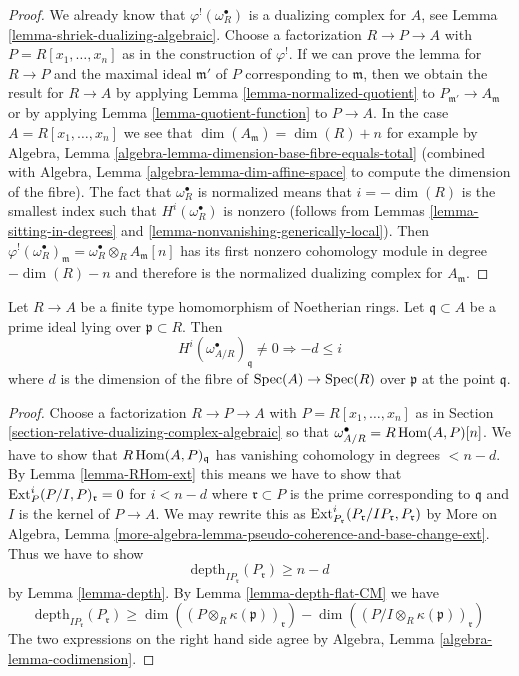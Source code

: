 \begin{proof}
We already know that $\varphi^!(\omega_R^\bullet)$ is a dualizing
complex for $A$, see Lemma \ref{lemma-shriek-dualizing-algebraic}.
Choose a factorization $R \to P \to A$ with $P = R[x_1, \ldots, x_n]$
as in the construction of $\varphi^!$. If we can prove the
lemma for $R \to P$ and the maximal ideal $\mathfrak m'$ of $P$ corresponding to
$\mathfrak m$, then we obtain the result for $R \to A$ by
applying Lemma \ref{lemma-normalized-quotient} to
$P_{\mathfrak m'} \to A_\mathfrak m$ or by applying
Lemma \ref{lemma-quotient-function} to $P \to A$.
In the case $A = R[x_1, \ldots, x_n]$ we see that
$\dim(A_\mathfrak m) = \dim(R) + n$ for example by
Algebra, Lemma \ref{algebra-lemma-dimension-base-fibre-equals-total}
(combined with Algebra, Lemma \ref{algebra-lemma-dim-affine-space}
to compute the dimension of the fibre).
The fact that $\omega_R^\bullet$ is normalized means
that $i = -\dim(R)$ is the smallest index such that
$H^i(\omega_R^\bullet)$ is nonzero (follows from
Lemmas \ref{lemma-sitting-in-degrees} and
\ref{lemma-nonvanishing-generically-local}).
Then $\varphi^!(\omega_R^\bullet)_\mathfrak m =
\omega_R^\bullet \otimes_R A_\mathfrak m[n]$
has its first nonzero cohomology module in degree $-\dim(R) - n$
and therefore is the normalized dualizing complex for $A_\mathfrak m$.
\end{proof}

\begin{lemma}
\label{lemma-relative-dualizing-trivial-vanishing}
Let $R \to A$ be a finite type homomorphism of Noetherian rings.
Let $\mathfrak q \subset A$ be a prime ideal lying over
$\mathfrak p \subset R$. Then
$$
H^i(\omega_{A/R}^\bullet)_\mathfrak q \not = 0
\Rightarrow - d \leq i
$$
where $d$ is the dimension of the fibre of $\mathop{\mathrm{Spec}}(A) \to \mathop{\mathrm{Spec}}(R)$
over $\mathfrak p$ at the point $\mathfrak q$.
\end{lemma}

\begin{proof}
Choose a factorization $R \to P \to A$ with $P = R[x_1, \ldots, x_n]$
as in Section \ref{section-relative-dualizing-complex-algebraic}
so that $\omega_{A/R}^\bullet = R\mathop{\mathrm{Hom}}\nolimits(A, P)[n]$.
We have to show that $R\mathop{\mathrm{Hom}}\nolimits(A, P)_\mathfrak q$
has vanishing cohomology in degrees $< n - d$.
By Lemma \ref{lemma-RHom-ext} this means we have to
show that $\mathop{\mathrm{Ext}}\nolimits_P^i(P/I, P)_{\mathfrak r} = 0$ for $i < n - d$
where $\mathfrak r \subset P$ is the prime corresponding to $\mathfrak q$
and $I$ is the kernel of $P \to A$.
We may rewrite this as
$\mathop{\mathrm{Ext}}\nolimits_{P_\mathfrak r}^i(P_\mathfrak r/IP_\mathfrak r, P_\mathfrak r)$
by More on Algebra, Lemma
\ref{more-algebra-lemma-pseudo-coherence-and-base-change-ext}.
Thus we have to show
$$
\text{depth}_{IP_\mathfrak r}(P_\mathfrak r) \geq n - d
$$
by Lemma \ref{lemma-depth}.
By Lemma \ref{lemma-depth-flat-CM} we have
$$
\text{depth}_{IP_\mathfrak r}(P_\mathfrak r) \geq
\dim((P \otimes_R \kappa(\mathfrak p))_\mathfrak r) -
\dim((P/I \otimes_R \kappa(\mathfrak p))_\mathfrak r)
$$
The two expressions on the right hand side agree by
Algebra, Lemma \ref{algebra-lemma-codimension}.
\end{proof}

